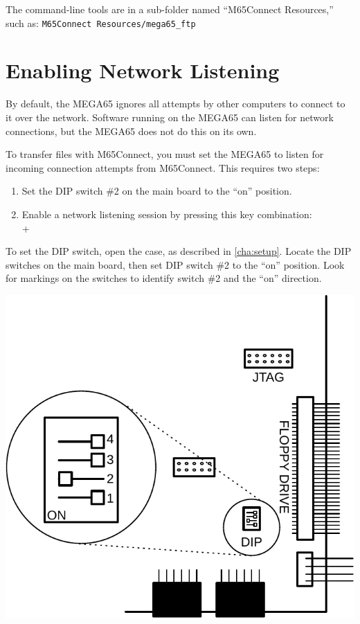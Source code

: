 The command-line tools are in a sub-folder named ``M65Connect Resources,'' such as: {\tt M65Connect Resources/mega65\_ftp}

\section{Enabling Network Listening}

By default, the MEGA65 ignores all attempts by other computers to connect to it over the network. Software running on the MEGA65 can listen for network connections, but the MEGA65 does not do this on its own.

To transfer files with M65Connect, you must set the MEGA65 to listen for incoming connection attempts from M65Connect. This requires two steps:

\begin{enumerate}
\item Set the DIP switch \#2 on the main board to the ``on'' position.
\item Enable a network listening session by pressing this key combination: \\  + \megakey{\pounds}
\end{enumerate}

To set the DIP switch, open the case, as described in \vref{cha:setup}. Locate the DIP switches on the main board, then set DIP switch \#2 to the ``on'' position. Look for markings on the switches to identify switch \#2 and the ``on'' direction.

\begin{center}
\includegraphics[width=\linewidth]{images/illustrations/mega65-dip2.pdf}
\end{center}

